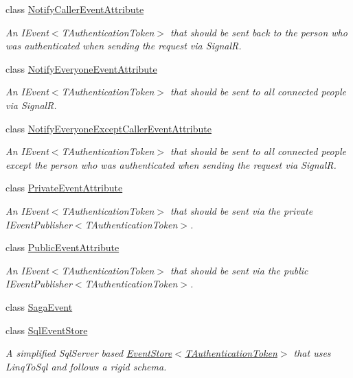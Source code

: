 \begin{DoxyCompactItemize}
\item 
class \hyperlink{classCqrs_1_1Events_1_1NotifyCallerEventAttribute}{Notify\+Caller\+Event\+Attribute}
\begin{DoxyCompactList}\small\item\em An I\+Event$<$\+T\+Authentication\+Token$>$ that should be sent back to the person who was authenticated when sending the request via SignalR. \end{DoxyCompactList}\item 
class \hyperlink{classCqrs_1_1Events_1_1NotifyEveryoneEventAttribute}{Notify\+Everyone\+Event\+Attribute}
\begin{DoxyCompactList}\small\item\em An I\+Event$<$\+T\+Authentication\+Token$>$ that should be sent to all connected people via SignalR. \end{DoxyCompactList}\item 
class \hyperlink{classCqrs_1_1Events_1_1NotifyEveryoneExceptCallerEventAttribute}{Notify\+Everyone\+Except\+Caller\+Event\+Attribute}
\begin{DoxyCompactList}\small\item\em An I\+Event$<$\+T\+Authentication\+Token$>$ that should be sent to all connected people except the person who was authenticated when sending the request via SignalR. \end{DoxyCompactList}\item 
class \hyperlink{classCqrs_1_1Events_1_1PrivateEventAttribute}{Private\+Event\+Attribute}
\begin{DoxyCompactList}\small\item\em An I\+Event$<$\+T\+Authentication\+Token$>$ that should be sent via the private I\+Event\+Publisher$<$\+T\+Authentication\+Token$>$. \end{DoxyCompactList}\item 
class \hyperlink{classCqrs_1_1Events_1_1PublicEventAttribute}{Public\+Event\+Attribute}
\begin{DoxyCompactList}\small\item\em An I\+Event$<$\+T\+Authentication\+Token$>$ that should be sent via the public I\+Event\+Publisher$<$\+T\+Authentication\+Token$>$. \end{DoxyCompactList}\item 
class \hyperlink{classCqrs_1_1Events_1_1SagaEvent}{Saga\+Event}
\item 
class \hyperlink{classCqrs_1_1Events_1_1SqlEventStore}{Sql\+Event\+Store}
\begin{DoxyCompactList}\small\item\em A simplified Sql\+Server based \hyperlink{classCqrs_1_1Events_1_1EventStore_a6346cb2aea4c5b4e740dc6cfb15abab8_a6346cb2aea4c5b4e740dc6cfb15abab8}{Event\+Store$<$\+T\+Authentication\+Token$>$} that uses Linq\+To\+Sql and follows a rigid schema. \end{DoxyCompactList}\end{DoxyCompactItemize}
